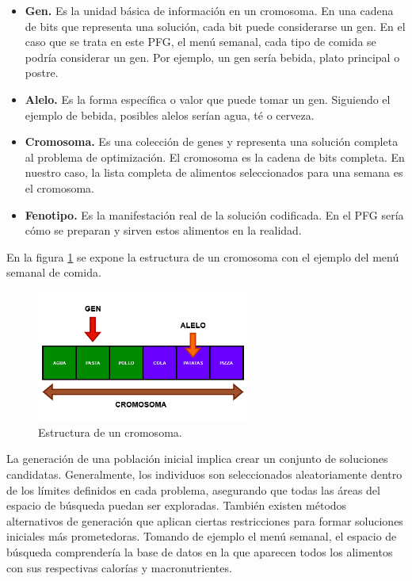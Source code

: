 \begin{itemize}
    \item \textbf{Gen.} Es la unidad básica de información en un cromosoma. En una cadena de bits que representa una solución, cada bit puede considerarse un gen. En el caso que se trata en este PFG, el menú semanal, cada tipo de comida se podría considerar un gen. Por ejemplo, un gen sería bebida, plato principal o postre.
    \item \textbf{Alelo.} Es la forma específica o valor que puede tomar un gen. Siguiendo el ejemplo de bebida, posibles alelos serían agua, té o cerveza.
    \item \textbf{Cromosoma.} Es una colección de genes y representa una solución completa al problema de optimización. El cromosoma es la cadena de bits completa. En nuestro caso, la lista completa de alimentos seleccionados para una semana es el cromosoma. 
    \item \textbf{Fenotipo.} Es la manifestación real de la solución codificada. En el PFG sería cómo se preparan y sirven estos alimentos en la realidad.
\end{itemize}

En la figura \ref{fig:cromosoma} se expone la estructura de un cromosoma con el ejemplo del menú semanal de comida.

\begin{figure}[H]
  \centering
  \includegraphics[width=0.625\textwidth]{figures/cromosoma.png}
  \caption{Estructura de un cromosoma.}
  \label{fig:cromosoma}
\end{figure}
\newpage
La generación de una población inicial implica crear un conjunto de soluciones candidatas. Generalmente, los individuos son seleccionados aleatoriamente dentro de los límites definidos en cada problema, asegurando que todas las áreas del espacio de búsqueda puedan ser exploradas. También existen métodos alternativos de generación que aplican ciertas restricciones para formar soluciones iniciales más prometedoras. Tomando de ejemplo el menú semanal, el espacio de búsqueda comprendería la base de datos en la que aparecen todos los alimentos con sus respectivas calorías y macronutrientes. 


